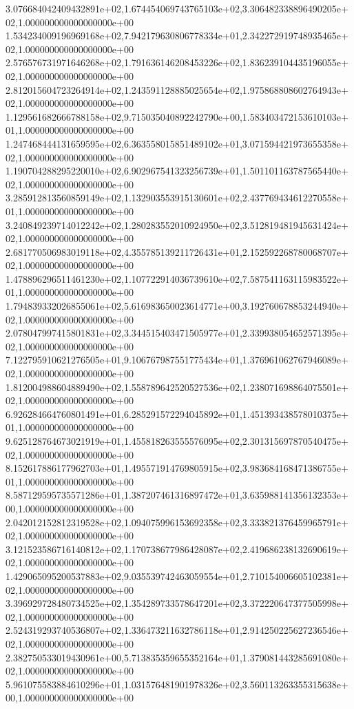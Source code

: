 3.076684042409432891e+02,1.674454069743765103e+02,3.306482338896490205e+02,1.000000000000000000e+00
1.534234009196969168e+02,7.942179630806778334e+01,2.342272919748935465e+02,1.000000000000000000e+00
2.576576731971646268e+02,1.791636146208453226e+02,1.836239104435196055e+02,1.000000000000000000e+00
2.812015604723264914e+02,1.243591128885025654e+02,1.975868808602764943e+02,1.000000000000000000e+00
1.129561682666788158e+02,9.715035040892242790e+00,1.583403472153610103e+01,1.000000000000000000e+00
1.247468444131659595e+02,6.363558015851489102e+01,3.071594421973655358e+02,1.000000000000000000e+00
1.190704288295220010e+02,6.902967541323256739e+01,1.501101163787565440e+02,1.000000000000000000e+00
3.285912813560859149e+02,1.132903553915130601e+02,2.437769434612270558e+01,1.000000000000000000e+00
3.240849239714012242e+02,1.280283552010924950e+02,3.512819481945631424e+02,1.000000000000000000e+00
2.681770506983019118e+02,4.355785139211726431e+01,2.152592268780068707e+02,1.000000000000000000e+00
1.478896296511461230e+02,1.107722914036739610e+02,7.587541163115983522e+01,1.000000000000000000e+00
1.794839332026855061e+02,5.616983650023614771e+00,3.192760678853244940e+02,1.000000000000000000e+00
2.078047997415801831e+02,3.344515403471505977e+01,2.339938054652571395e+02,1.000000000000000000e+00
7.122795910621276505e+01,9.106767987551775434e+01,1.376961062767946089e+02,1.000000000000000000e+00
1.812004988604889490e+02,1.558789642520527536e+02,1.238071698864075501e+02,1.000000000000000000e+00
6.926284664760801491e+01,6.285291572294045892e+01,1.451393438578010375e+01,1.000000000000000000e+00
9.625128764673021919e+01,1.455818263555576095e+02,2.301315697870540475e+02,1.000000000000000000e+00
8.152617886177962703e+01,1.495571914769805915e+02,3.983684168471386755e+01,1.000000000000000000e+00
8.587129595735571286e+01,1.387207461316897472e+01,3.635988141356132353e+00,1.000000000000000000e+00
2.042012152812319528e+02,1.094075996153692358e+02,3.333821376459965791e+02,1.000000000000000000e+00
3.121523586716140812e+02,1.170738677986428087e+02,2.419686238132690619e+02,1.000000000000000000e+00
1.429065095200537883e+02,9.035539742463059554e+01,2.710154006605102381e+02,1.000000000000000000e+00
3.396929728480734525e+02,1.354289733578647201e+02,3.372220647377505998e+02,1.000000000000000000e+00
2.524319293740536807e+02,1.336473211632786118e+01,2.914250225627236546e+02,1.000000000000000000e+00
2.382750533019430961e+00,5.713835359655352164e+01,1.379081443285691080e+02,1.000000000000000000e+00
5.961075583884610296e+01,1.031576481901978326e+02,3.560113263355315638e+00,1.000000000000000000e+00
